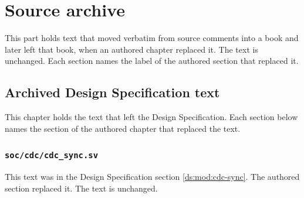 \part{Source archive}\label{cr:part:source-archive}

This part holds text that moved verbatim from source comments into a book and later left that book, when an authored chapter replaced it. The text is unchanged. Each section names the label of the authored section that replaced it.

\chapter{Archived Design Specification text}\label{cr:ch:source-archive-ds}

This chapter holds the text that left the Design Specification. Each section below names the section of the authored chapter that replaced the text.

\section{\texttt{soc/cdc/cdc\_sync.sv}}\label{cr:arc:ds-cdc-sync}

This text was in the Design Specification section \cref{ds:mod:cdc-sync}. The authored section replaced it. The text is unchanged.

